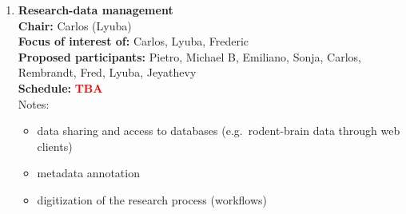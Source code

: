 \documentclass[10pt, a4paper,twoside,american]{article}
\newcommand{\alert}[1]{\textcolor{red}{\bf #1}}
\begin{document}
\begin{enumerate}[resume]
  {\bf Proposed participants:} Alper, Sepehr, Daniel M, Michael D, Sven, Jyotika, Philipp, Johanna, Hannah, Moritz\\[1ex]
  {\bf Schedule:} 
  \begin{itemize}
  \item VisNEST [Maximilian, 10']
  \item Correlation Analyzer [Pietro, 10']
  \item VIOLA (4x4 Visualizer) [Johanna, 10']
  \item Visiphant and NEST-Elephant Multiview [Michael, 10']
  \item Generation and visualization of graphs with python-igraph [Maximilian, 10']
  \item pyQT [Alper, 10']
  \item maya-vi [Michael]
  \item Discussion
    \begin{itemize}
    \item Scripts and command-line tools vs. GUI
    \item Bring your plots - favorite or problematic plots
    \end{itemize}
  \end{itemize}
  Notes:
  \begin{itemize}
  \item see books recommended by Benni W
  \end{itemize}
\item {\large\bf Research-data management}\\[1ex]
  {\bf Chair:} Carlos (Lyuba)\\[1ex]
  {\bf Focus of interest of:} Carlos, Lyuba, Frederic\\[1ex]
  {\bf Proposed participants:} Pietro, Michael B, Emiliano, Sonja, Carlos, Rembrandt, Fred, Lyuba, Jeyathevy\\[1ex]
  {\bf Schedule:} \alert{TBA}\\[1ex]
  Notes:
  \begin{itemize}
  \item data sharing and access to databases (e.g.~rodent-brain data through web clients)
  \item metadata annotation
  \item digitization of the research process (workflows)
  \end{itemize}
\end{enumerate}
\end{document}
